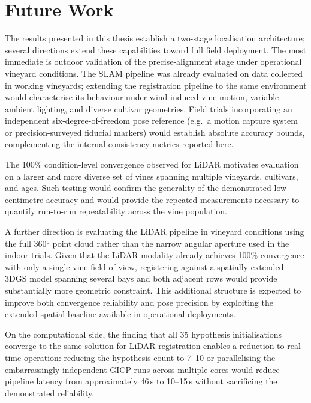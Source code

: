 \section{Future Work}
\label{sec:future-work}

The results presented in this thesis establish a  two-stage localisation architecture; several directions extend these capabilities toward full field deployment. The most immediate is outdoor validation of the precise-alignment stage under operational vineyard conditions. The SLAM pipeline was already evaluated on data collected in working vineyards; extending the registration pipeline to the same environment would characterise its behaviour under wind-induced vine motion, variable ambient lighting, and diverse cultivar geometries. Field trials incorporating an independent six-degree-of-freedom pose reference (e.g.\ a motion capture system or precision-surveyed fiducial markers) would establish absolute accuracy bounds, complementing the internal consistency metrics reported here.

The 100\% condition-level convergence observed for LiDAR motivates evaluation on a larger and more diverse set of vines spanning multiple vineyards, cultivars, and ages. Such testing would confirm the generality of the demonstrated low-centimetre accuracy and would provide the repeated measurements necessary to quantify run-to-run repeatability across the vine population.

A further direction is evaluating the LiDAR pipeline in vineyard conditions using the full 360° point cloud rather than the narrow angular aperture used in the indoor trials. Given that the LiDAR modality already achieves 100\% convergence with only a single-vine field of view, registering against a spatially extended 3DGS model spanning several bays and both adjacent rows would provide substantially more geometric constraint. This additional structure is expected to improve both convergence reliability and pose precision by exploiting the extended spatial baseline available in operational deployments.

On the computational side, the finding that all 35 hypothesis initialisations converge to the same solution for LiDAR registration enables a reduction to real-time operation: reducing the hypothesis count to 7--10 or parallelising the embarrassingly independent GICP runs across multiple cores would reduce pipeline latency from approximately 46\,s to 10--15\,s without sacrificing the demonstrated reliability.

